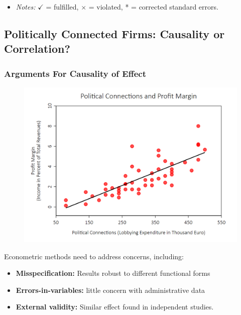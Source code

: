 \documentclass[a4paper,12pt]{article}
\begin{document}
\begin{table}[H]
{\begin{itemize}

\item \textit{Notes:} $\checkmark$ = fulfilled, $\times$ = violated, * = corrected standard errors.

\end{itemize}
}

\end{table}
\clearpage



\subsection{Politically Connected Firms: Causality or Correlation?}



\subsubsection*{Arguments \textbf{For} Causality of Effect}

\begin{figure}[H]
	\centering
		\includegraphics[width=.90\textwidth]{figures/politicallyconnected4}
\end{figure}

Econometric methods need to address concerns, including:
\begin{itemize}
 \item \textbf{Misspecification:} Results robust to different functional forms
 \item \textbf{Errors-in-variables:} little concern with administrative data
 \item \textbf{External validity:} Similar effect found in independent studies.\\[3ex]
\end{itemize}
\end{document}
